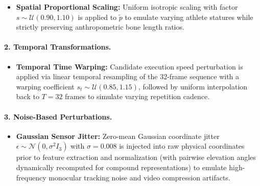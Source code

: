 \documentclass[runningheads]{llncs}
\begin{document}
\begin{itemize}
\begin{equation}
    \end{equation}
    Because $R_y(\alpha)$ acts strictly within the transverse plane, vertical displacement remains invariant ($\Delta y' = \Delta y$) and horizontal Euclidean radius is identically preserved:
    \begin{equation}
    \label{eq:yaw_invariance}
        \Delta x'^2 + \Delta z'^2 = (\Delta x \cos\alpha + \Delta z \sin\alpha)^2 + (-\Delta x \sin\alpha + \Delta z \cos\alpha)^2 = \Delta x^2 + \Delta z^2.
    \end{equation}
    Consequently, elevation angles satisfy $\theta' = \theta$, preserving biological limb inclination relative to gravity while teaching the network viewpoint invariance.
    \item \textbf{Spatial Proportional Scaling:} Uniform isotropic scaling with factor $s \sim \mathcal{U}(0.90, 1.10)$ is applied to $\tilde{p}$ to emulate varying athlete statures while strictly preserving anthropometric bone length ratios.
\end{itemize}

\paragraph{2. Temporal Transformations.}
\begin{itemize}
    \item \textbf{Temporal Time Warping:} Candidate execution speed perturbation is applied via linear temporal resampling of the 32-frame sequence with a warping coefficient $s_t \sim \mathcal{U}(0.85, 1.15)$, followed by uniform interpolation back to $T=32$ frames to simulate varying repetition cadence.
\end{itemize}

\paragraph{3. Noise-Based Perturbations.}
\begin{itemize}
    \item \textbf{Gaussian Sensor Jitter:} Zero-mean Gaussian coordinate jitter $\epsilon \sim \mathcal{N}(0, \sigma^2 I_3)$ with $\sigma = 0.008$ is injected into raw physical coordinates prior to feature extraction and normalization (with pairwise elevation angles dynamically recomputed for compound representations) to emulate high-frequency monocular tracking noise and video compression artifacts.
\end{itemize}
\end{document}
